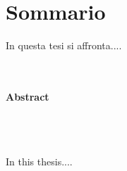 \chapter*{Sommario}
\thispagestyle{empty}

In questa tesi si affronta....\\
\\
\\
\noindent
\begin{Huge}
\textbf{Abstract}
\end{Huge}
\\
\\
\\
\noindent
In this thesis....
